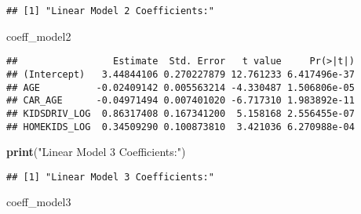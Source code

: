 \documentclass[
]{article}
\newenvironment{Shaded}{\begin{snugshade}}{\end{snugshade}}
\newcommand{\FunctionTok}[1]{\textcolor[rgb]{0.13,0.29,0.53}{\textbf{#1}}}
\newcommand{\NormalTok}[1]{#1}
\newcommand{\StringTok}[1]{\textcolor[rgb]{0.31,0.60,0.02}{#1}}
\begin{document}
\begin{verbatim}
## [1] "Linear Model 2 Coefficients:"
\end{verbatim}

\begin{Shaded}
\begin{Highlighting}[]
\NormalTok{coeff\_model2}
\end{Highlighting}
\end{Shaded}

\begin{verbatim}
##                 Estimate  Std. Error   t value     Pr(>|t|)
## (Intercept)   3.44844106 0.270227879 12.761233 6.417496e-37
## AGE          -0.02409142 0.005563214 -4.330487 1.506806e-05
## CAR_AGE      -0.04971494 0.007401020 -6.717310 1.983892e-11
## KIDSDRIV_LOG  0.86317408 0.167341200  5.158168 2.556455e-07
## HOMEKIDS_LOG  0.34509290 0.100873810  3.421036 6.270988e-04
\end{verbatim}

\begin{Shaded}
\begin{Highlighting}[]
\FunctionTok{print}\NormalTok{(}\StringTok{"Linear Model 3 Coefficients:"}\NormalTok{)}
\end{Highlighting}
\end{Shaded}

\begin{verbatim}
## [1] "Linear Model 3 Coefficients:"
\end{verbatim}

\begin{Shaded}
\begin{Highlighting}[]
\NormalTok{coeff\_model3}
\end{Highlighting}
\end{Shaded}
\end{document}
